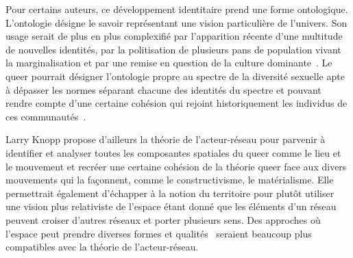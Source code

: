 Pour certains auteurs, ce développement identitaire prend une forme ontologique.
L'ontologie désigne le savoir représentant une vision particulière de l'univers.
Son usage serait de plus en plus complexifié par l'apparition récente d'une multitude de nouvelles identités, par la politisation de plusieurs pans de population vivant la marginalisation et par une remise en question de la culture dominante~\citep[122]{Knopp2004}.
Le queer pourrait désigner l'ontologie propre au spectre de la diversité sexuelle apte à dépasser les normes séparant chacune des identités du spectre \lgbt{} et pouvant rendre compte d'une certaine cohésion qui rejoint historiquement les individus de ces communautés~\citep[122]{Knopp2004}.

Larry Knopp propose d'ailleurs la théorie de l'acteur-réseau pour parvenir à identifier et analyser toutes les composantes spatiales du queer comme le lieu et le mouvement et recréer une certaine cohésion de la théorie queer face aux divers mouvements qui la façonnent, comme le constructivisme, le matérialisme.
Elle permettrait également d'échapper à la notion du territoire pour plutôt utiliser une vision plus relativiste de l'espace étant donné que les éléments d'un réseau peuvent croiser d'autres réseaux et porter plusieurs sens.
Des approches où l'espace peut prendre diverses formes et qualités~\citep{DiMeo1998} seraient beaucoup plus compatibles avec la théorie de l'acteur-réseau.

